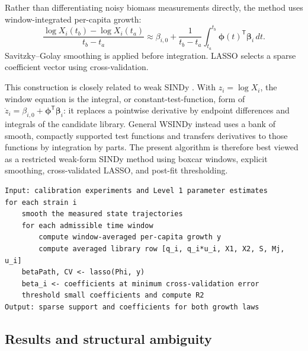 \documentclass[11pt,a4paper]{article}
\newcommand{\vect}[1]{\boldsymbol{#1}}
\begin{document}
Rather than differentiating noisy biomass measurements directly, the method
uses window-integrated per-capita growth:
\begin{equation}
  \frac{\log X_i(t_b)-\log X_i(t_a)}{t_b-t_a}
  \approx
  \beta_{i,0}
  + \frac{1}{t_b-t_a}
    \int_{t_a}^{t_b}\vect{\phi}(t)^{\mathsf T}\vect{\beta}_i\,dt.
\end{equation}
Savitzky--Golay smoothing is applied before integration. LASSO selects a sparse
coefficient vector using cross-validation.

This construction is closely related to weak SINDy
\cite{MessengerBortz2021}. With \(z_i=\log X_i\), the window equation is the
integral, or constant-test-function, form of
\(\dot z_i=\beta_{i,0}+\vect{\phi}^{\mathsf T}\vect{\beta}_i\): it replaces a
pointwise derivative by endpoint differences and integrals of the candidate
library. General WSINDy instead uses a bank of smooth, compactly supported test
functions and transfers derivatives to those functions by integration by
parts. The present algorithm is therefore best viewed as a restricted
weak-form SINDy method using boxcar windows, explicit smoothing,
cross-validated LASSO, and post-fit thresholding.

\noindent\begin{minipage}{\linewidth}
\begin{lstlisting}[style=pseudostyle,title={Compact MATLAB pseudocode}]
Input: calibration experiments and Level 1 parameter estimates
for each strain i
    smooth the measured state trajectories
    for each admissible time window
        compute window-averaged per-capita growth y
        compute averaged library row [q_i, q_i*u_i, X1, X2, S, Mj, u_i]
    betaPath, CV <- lasso(Phi, y)
    beta_i <- coefficients at minimum cross-validation error
    threshold small coefficients and compute R2
Output: sparse support and coefficients for both growth laws
\end{lstlisting}
\end{minipage}

\subsection{Results and structural ambiguity}
\end{document}
